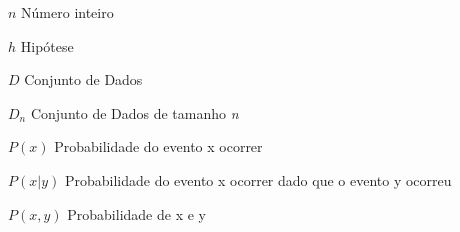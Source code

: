 \renewcommand{\nomname}{\listadesimbolosname}
\pdfbookmark[0]{\nomname}{las}
\cleardoublepage
\begin{simbolos} 	
    \item[$n$] Número inteiro
    \item[$h$] Hipótese
    \item[$D$] Conjunto de Dados
    \item[$D_n$] Conjunto de Dados de tamanho \textit{n}
    \item[$P(x)$] Probabilidade do evento x ocorrer
    \item[$P(x|y)$] Probabilidade do evento x ocorrer dado que o evento y ocorreu
    \item[$P(x,y)$] Probabilidade de x e y
\end{simbolos}